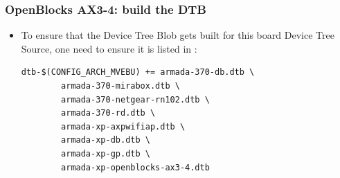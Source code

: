 \begin{frame}[fragile]
  \frametitle{OpenBlocks AX3-4: build the DTB}
  \begin{itemize}
  \item To ensure that the Device Tree Blob gets built for this board
    Device Tree Source, one need to ensure it is listed in
    :
    \begin{block}{}
      \begin{verbatim}
dtb-$(CONFIG_ARCH_MVEBU) += armada-370-db.dtb \
        armada-370-mirabox.dtb \
        armada-370-netgear-rn102.dtb \
        armada-370-rd.dtb \
        armada-xp-axpwifiap.dtb \
        armada-xp-db.dtb \
        armada-xp-gp.dtb \
        armada-xp-openblocks-ax3-4.dtb
      \end{verbatim}
    \end{block}
  \end{itemize}
\end{frame}